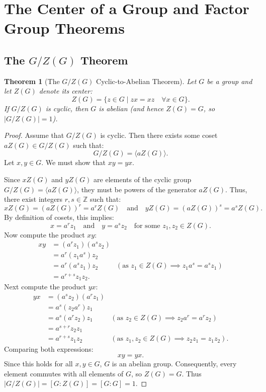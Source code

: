\documentclass[12pt]{article}
\theoremstyle{definition}
\theoremstyle{plain}
\newtheorem{theorem}{Theorem}[section]
\begin{document}
\newpage
\section{The Center of a Group and Factor Group Theorems}

\subsection{The \texorpdfstring{$G/Z(G)$}{G/Z(G)} Theorem}

\begin{theorem}[The $G/Z(G)$ Cyclic-to-Abelian Theorem]
Let $G$ be a group and let $Z(G)$ denote its center:
\[
Z(G) = \{ z \in G \mid zx = xz \quad \forall x \in G \}.
\]
If $G/Z(G)$ is cyclic, then $G$ is abelian (and hence $Z(G) = G$, so $|G/Z(G)| = 1$).
\end{theorem}

\begin{proof}
Assume that $G/Z(G)$ is cyclic.
Then there exists some coset $a Z(G) \in G/Z(G)$ such that:
\[
G/Z(G) = \langle a Z(G) \rangle.
\]
Let $x, y \in G$. We must show that $xy = yx$.

Since $x Z(G)$ and $y Z(G)$ are elements of the cyclic group $G/Z(G) = \langle a Z(G) \rangle$, they must be powers of the generator $a Z(G)$. Thus, there exist integers $r, s \in \mathbb{Z}$ such that:
\[
x Z(G) = (a Z(G))^r = a^r Z(G) \quad \text{and} \quad y Z(G) = (a Z(G))^s = a^s Z(G).
\]
By definition of cosets, this implies:
\[
x = a^r z_1 \quad \text{and} \quad y = a^s z_2 \quad \text{for some } z_1, z_2 \in Z(G).
\]
Now compute the product $xy$:
\begin{align*}
xy &= (a^r z_1)(a^s z_2) \\
&= a^r (z_1 a^s) z_2 \\
&= a^r (a^s z_1) z_2 & (\text{as } z_1 \in Z(G) \implies z_1 a^s = a^s z_1) \\
&= a^{r+s} z_1 z_2.
\end{align*}
Next compute the product $yx$:
\begin{align*}
yx &= (a^s z_2)(a^r z_1) \\
&= a^s (z_2 a^r) z_1 \\
&= a^s (a^r z_2) z_1 & (\text{as } z_2 \in Z(G) \implies z_2 a^r = a^r z_2) \\
&= a^{s+r} z_2 z_1 \\
&= a^{r+s} z_1 z_2 & (\text{as } z_1, z_2 \in Z(G) \implies z_2 z_1 = z_1 z_2).
\end{align*}
Comparing both expressions:
\[
xy = yx.
\]
Since this holds for all $x, y \in G$, $G$ is an abelian group.
Consequently, every element commutes with all elements of $G$, so $Z(G) = G$.
Thus $|G/Z(G)| = [G : Z(G)] = [G : G] = 1$.
\end{proof}
\end{document}
